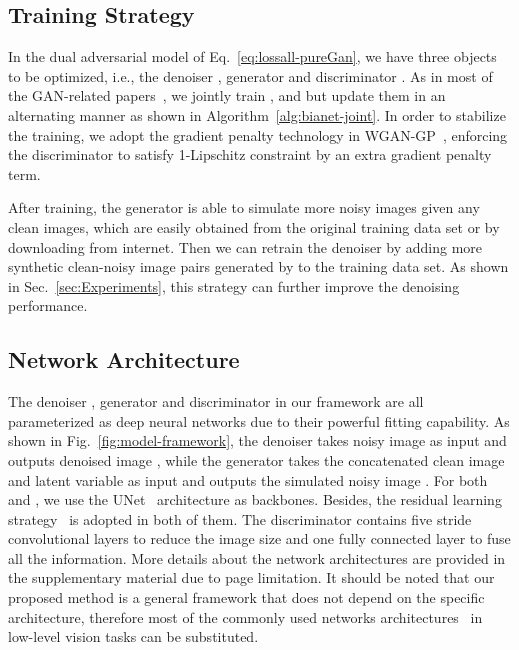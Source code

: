 \documentclass[runningheads]{llncs}
\begin{document}
\subsection{Training Strategy} \label{subsec:training}
In the dual adversarial model of Eq.~\eqref{eq:lossall-pureGan}, we have three objects to be
optimized, i.e., the denoiser , generator  and discriminator . As in most of the GAN-related
papers~\cite{goodfellow2014generative,arjovsky2017wasserstein,chongxuan2017triple}, we jointly train
,  and  but update them in an alternating manner as shown in Algorithm~\ref{alg:bianet-joint}.
In order to stabilize the training, we adopt the gradient penalty technology in 
WGAN-GP~\cite{gulrajani2017improved}, enforcing the discriminator to satisfy 1-Lipschitz
constraint by an extra gradient penalty term.

After training, the generator  is able to simulate more noisy images
given any clean images, which are easily obtained from the original training data set or by downloading
from internet. Then we can retrain the denoiser 
by adding more synthetic clean-noisy image pairs generated by  to the
training data set. As shown in Sec.~\ref{sec:Experiments}, this strategy can further improve the denoising performance.

\subsection{Network Architecture}
The denoiser , generator  and discriminator  in our framework are all parameterized 
as deep neural networks due to their powerful fitting capability.
As shown in Fig.~\ref{fig:model-framework}, the denoiser  takes noisy image  as input and outputs denoised
image , while the generator  takes the concatenated clean image  and latent variable
 as input and outputs the
simulated noisy image . For both  and , we use the UNet~\cite{Ronneberger2015} architecture as
backbones. Besides, the residual learning strategy~\cite{zhang2017beyond} is adopted in both of them.
The discriminator  contains
five stride convolutional layers to reduce the image size and one fully connected layer to fuse all the information.
More details about the network architectures are provided in the supplementary material due to
page limitation. It should be noted that our proposed method is a general framework that does not depend on the
specific architecture, therefore most of the commonly used networks architectures~\cite{zhang2017beyond,Mao2016,anwar2019real}
in low-level vision tasks can be substituted.
\end{document}
